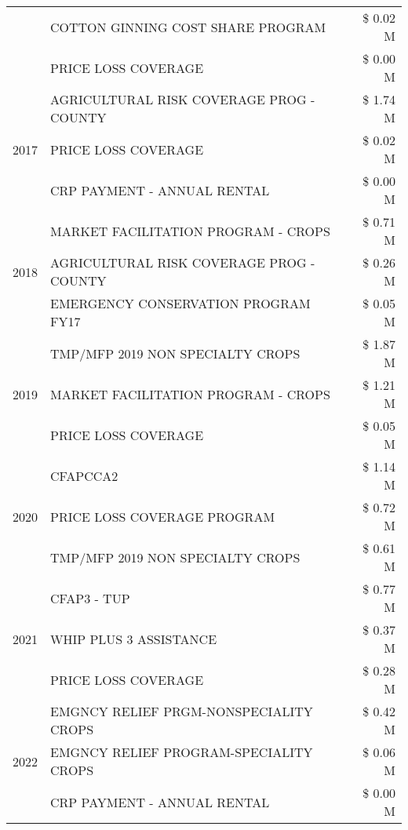 \begin{tabular}{llr}
 & COTTON GINNING COST SHARE PROGRAM & \$ 0.02 M \\
 & PRICE LOSS COVERAGE & \$ 0.00 M \\
\cline{1-3}
\multirow[t]{3}{*}{2017} & AGRICULTURAL RISK COVERAGE PROG - COUNTY & \$ 1.74 M \\
 & PRICE LOSS COVERAGE & \$ 0.02 M \\
 & CRP PAYMENT - ANNUAL RENTAL & \$ 0.00 M \\
\cline{1-3}
\multirow[t]{3}{*}{2018} & MARKET FACILITATION PROGRAM - CROPS & \$ 0.71 M \\
 & AGRICULTURAL RISK COVERAGE PROG - COUNTY & \$ 0.26 M \\
 & EMERGENCY CONSERVATION PROGRAM FY17 & \$ 0.05 M \\
\cline{1-3}
\multirow[t]{3}{*}{2019} & TMP/MFP 2019 NON SPECIALTY CROPS & \$ 1.87 M \\
 & MARKET FACILITATION PROGRAM - CROPS & \$ 1.21 M \\
 & PRICE LOSS COVERAGE & \$ 0.05 M \\
\cline{1-3}
\multirow[t]{3}{*}{2020} & CFAPCCA2 & \$ 1.14 M \\
 & PRICE LOSS COVERAGE PROGRAM & \$ 0.72 M \\
 & TMP/MFP 2019 NON SPECIALTY CROPS & \$ 0.61 M \\
\cline{1-3}
\multirow[t]{3}{*}{2021} & CFAP3 - TUP & \$ 0.77 M \\
 & WHIP PLUS 3 ASSISTANCE & \$ 0.37 M \\
 & PRICE LOSS COVERAGE & \$ 0.28 M \\
\cline{1-3}
\multirow[t]{3}{*}{2022} & EMGNCY RELIEF PRGM-NONSPECIALITY CROPS & \$ 0.42 M \\
 & EMGNCY RELIEF PROGRAM-SPECIALITY CROPS & \$ 0.06 M \\
 & CRP PAYMENT - ANNUAL RENTAL & \$ 0.00 M \\
\cline{1-3}
\bottomrule
\end{tabular}
